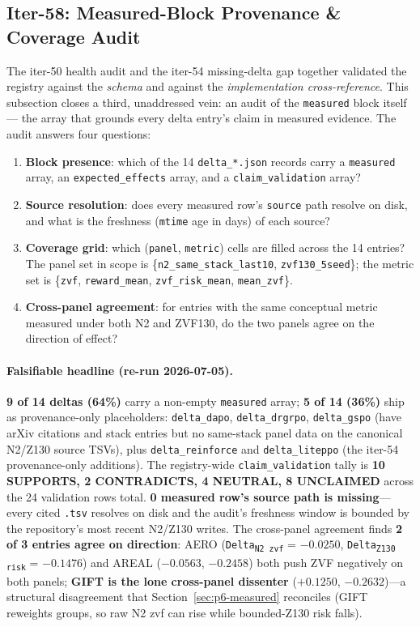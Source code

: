 \documentclass{article}
\providecommand{\secref}[1]{Section~\ref{#1}}
\begin{document}
 \subsection{Iter-58: Measured-Block Provenance \& Coverage Audit}
\label{sec:p6-measured-coverage}

The iter-50 health audit and the iter-54 missing-delta gap together
validated the registry against the \emph{schema} and against the
\emph{implementation cross-reference}. This subsection closes a third,
unaddressed vein: an audit of the \texttt{measured} block itself---
the array that grounds every delta entry's claim in measured evidence.
The audit answers four questions:

\begin{enumerate}
\item \textbf{Block presence}: which of the 14 \texttt{delta\_*.json}
records carry a \texttt{measured} array, an \texttt{expected\_effects}
array, and a \texttt{claim\_validation} array?
\item \textbf{Source resolution}: does every measured row's
\texttt{source} path resolve on disk, and what is the freshness
(\texttt{mtime} age in days) of each source?
\item \textbf{Coverage grid}: which (\texttt{panel},
\texttt{metric}) cells are filled across the 14 entries? The panel set
in scope is \{\texttt{n2\_same\_stack\_last10},
\texttt{zvf130\_5seed}\}; the metric set is
\{\texttt{zvf}, \texttt{reward\_mean},
\texttt{zvf\_risk\_mean}, \texttt{mean\_zvf}\}.
\item \textbf{Cross-panel agreement}: for entries with the same
conceptual metric measured under both N2 and ZVF130, do the two
panels agree on the direction of effect?
\end{enumerate}

\paragraph{Falsifiable headline (re-run 2026-07-05).}
\textbf{9 of 14 deltas (64\%)} carry a non-empty \texttt{measured}
array; \textbf{5 of 14 (36\%)} ship as provenance-only
placeholders: \texttt{delta\_dapo}, \texttt{delta\_drgrpo},
\texttt{delta\_gspo} (have arXiv citations and stack entries but no
same-stack panel data on the canonical N2/Z130 source TSVs), plus
\texttt{delta\_reinforce} and \texttt{delta\_liteppo} (the iter-54
provenance-only additions). The registry-wide \texttt{claim\_validation}
tally is \textbf{10 SUPPORTS, 2 CONTRADICTS, 4 NEUTRAL, 8 UNCLAIMED}
across the 24 validation rows total. \textbf{0 measured row's source
path is missing}---every cited \texttt{.tsv} resolves on disk and
the audit's freshness window is bounded by the repository's most recent
N2/Z130 writes. The cross-panel agreement finds \textbf{2 of 3 entries
agree on direction}: AERO (\texttt{Delta\textsubscript{N2 zvf}} =
$-0.0250$, \texttt{Delta\textsubscript{Z130 risk}} = $-0.1476$)
and AREAL ($-0.0563$, $-0.2458$) both push ZVF negatively on both
panels; \textbf{GIFT is the lone cross-panel dissenter}
($+0.1250$, $-0.2632$)---a structural disagreement that
\secref{sec:p6-measured} reconciles (GIFT reweights groups, so raw
N2 zvf can rise while bounded-Z130 risk falls).
\end{document}
